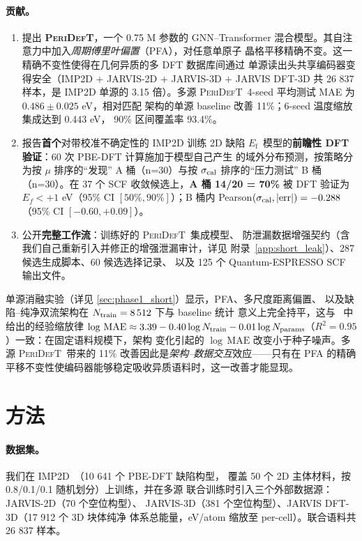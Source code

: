 \documentclass[UTF8,11pt,a4paper]{ctexart}
\newcommand{\Ef}{$E_{\mathrm{f}}$}
\newcommand{\modelname}{\textsc{PeriDefT}}
\begin{document}
\paragraph{贡献。}
\begin{enumerate}
\item 提出 \textbf{\modelname}，一个 0.75 M 参数的 GNN--Transformer
混合模型。其自注意力中加入\emph{周期傅里叶偏置}（PFA），对任意单原子
晶格平移精确不变。这一精确不变性使得在几何异质的多 DFT 数据库间通过
单源读出头共享编码器变得安全（IMP2D + JARVIS-2D + JARVIS-3D +
JARVIS DFT-3D 共 26 837 样本，是 IMP2D 单源的 3.15 倍）。多源
\modelname\ 4-seed 平均测试 MAE 为 $0.486\pm0.025$ eV，相对匹配
架构的单源 baseline 改善 11\%；6-seed 温度缩放集成达到 0.443 eV，
90\% 区间覆盖率 93.4\%。

\item 报告\textbf{首个}对带校准不确定性的 IMP2D 训练 2D 缺陷 \Ef\
模型的\textbf{前瞻性 DFT 验证}：60 次 PBE-DFT 计算施加于模型自己产生
的域外分布预测，按策略分为按 $\mu$ 排序的``发现'' A 桶（n=30）与按
$\sigma_{\rm cal}$ 排序的``压力测试'' B 桶（n=30）。在 37 个 SCF
收敛候选上，\textbf{A 桶 14/20 = 70\%} 被 DFT 验证为
$E_f<+1$ eV（95\% CI $[50\%,90\%]$）；B 桶内
Pearson$(\sigma_{\rm cal}, |\mathrm{err}|) = -0.288$
（95\% CI $[-0.60, +0.09]$）。

\item 公开\textbf{完整工作流}：训练好的 \modelname\ 集成模型、
防泄漏数据增强契约（含我们自己重新引入并修正的增强泄漏审计，详见
附录~\ref{app:short_leak}）、287 候选生成脚本、60 候选选择记录、
以及 125 个 Quantum-ESPRESSO SCF 输出文件。
\end{enumerate}

单源消融实验（详见 \ref{sec:phase1_short}）显示，PFA、多尺度距离偏置、
以及缺陷--纯净双流架构在 $N_{\rm train}=8\,512$ 下与 baseline 统计
意义上完全持平，这与~\cite{ourPaperV12} 中给出的经验缩放律
$\log\,\mathrm{MAE} \approx 3.39 - 0.40\log N_{\rm train} -
0.01\log N_{\rm params}$（$R^2=0.95$）一致：在固定语料规模下，架构
变化引起的 $\log\,\mathrm{MAE}$ 改变小于种子噪声。多源 \modelname\
带来的 11\% 改善因此是\emph{架构--数据交互}效应——只有在 PFA 的精确
平移不变性使编码器能够稳定吸收异质语料时，这一改善才能显现。

\section{方法}\label{sec:methods}

\paragraph{数据集。}
我们在 IMP2D~\cite{Bertoldo2022QPOD}（10 641 个 PBE-DFT 缺陷构型，
覆盖 50 个 2D 主体材料，按 0.8/0.1/0.1 随机划分）上训练，并在多源
联合训练时引入三个外部数据源：JARVIS-2D（70 个空位构型）、
JARVIS-3D（381 个空位构型）、JARVIS DFT-3D（17 912 个 3D 块体纯净
体系总能量，eV/atom 缩放至 per-cell）。联合语料共 26 837 样本。
\end{document}
